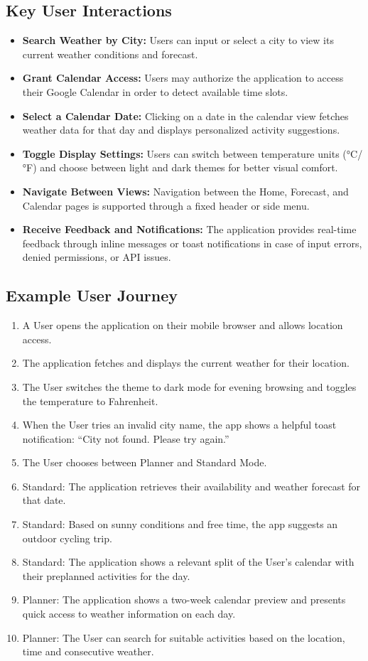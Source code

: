 \documentclass[fontsize=13pt,a4paper]{scrartcl}
\begin{document}
\newpage

\subsection{Key User Interactions}
\begin{itemize}[nosep]
  \item \textbf{Search Weather by City:} Users can input or select a city to view its current weather conditions and forecast.
  \item \textbf{Grant Calendar Access:} Users may authorize the application to access their Google Calendar in order to detect available time slots.
  \item \textbf{Select a Calendar Date:} Clicking on a date in the calendar view fetches weather data for that day and displays personalized activity suggestions.
  \item \textbf{Toggle Display Settings:} Users can switch between temperature units (°C/°F) and choose between light and dark themes for better visual comfort.
  \item \textbf{Navigate Between Views:} Navigation between the Home, Forecast, and Calendar pages is supported through a fixed header or side menu.
  \item \textbf{Receive Feedback and Notifications:} The application provides real-time feedback through inline messages or toast notifications in case of input errors, denied permissions, or API issues.
\end{itemize}

\subsection{Example User Journey}
\begin{enumerate}[nosep]
  \item A User opens the application on their mobile browser and allows location access.
  \item The application fetches and displays the current weather for their location.
  \item The User switches the theme to dark mode for evening browsing and toggles the temperature to Fahrenheit.
  \item When the User tries an invalid city name, the app shows a helpful toast notification: “City not found. Please try again.”
  \item The User chooses between Planner and Standard Mode.
  \item Standard: The application retrieves their availability and weather forecast for that date.
  \item Standard: Based on sunny conditions and free time, the app suggests an outdoor cycling trip.
  \item Standard: The application shows a relevant split of the User's calendar with their preplanned activities for the day.
  \item Planner: The application shows a two-week calendar preview and presents quick access to weather information on each day.
  \item Planner: The User can search for suitable activities based on the location, time and consecutive weather.
\end{enumerate}
\end{document}
